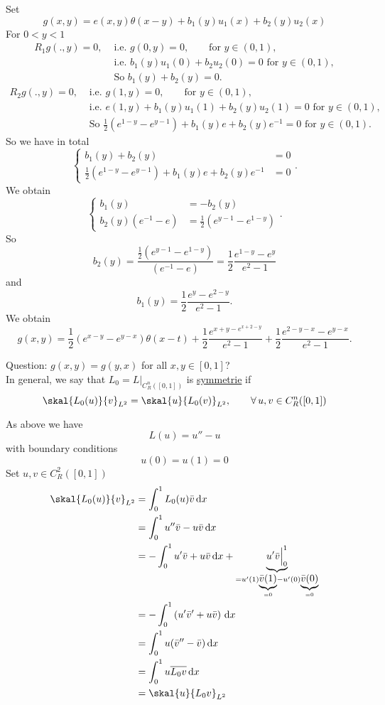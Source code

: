 Set 
\[
	g(x,y) = e(x,y)\theta(x-y) + b_1(y)u_1(x)+ b_2(y)u_2(x)
\]
For $0<y<1$
\begin{align*}
	R_1g(.,y)=0, &\text{ i.e. }g(0,y)=0, \qquad \text{for }y \in (0,1), \\
	 &\text{ i.e. }b_1(y)u_1(0)+ b_2u_2(0) = 0 \text{ for }y \in (0,1), \\
	 &\text{ So $b_1(y) + b_2(y) = 0$}.
\end{align*}
\begin{align*}
	R_2g(.,y)=0, &\text{ i.e. }g(1,y)=0, \qquad \text{for }y \in (0,1), \\
	 &\text{ i.e. }e(1,y) + b_1(y)u_1(1)+ b_2(y)u_2(1) = 0 \text{ for }y \in (0,1), \\
	 &\text{ So }\frac{1}{2}\left( e^{1-y}- e^{y-1} \right) + b_1(y)e + b_2(y)e^{-1}=0 \text{ for }y \in (0,1).
\end{align*}
So we have in total
\[
	\begin{cases}
		b_1(y) + b_2(y) &= 0 \\
		\frac{1}{2}\left( e^{1-y}- e^{y-1} \right) + b_1(y)e + b_2(y)e^{-1} &=0 
	\end{cases}.
\]
We obtain
\[
	\begin{cases}
		b_1(y) &= -b_2(y) \\
		b_2(y)\left(  e^{-1} - e \right) &= \frac{1}{2}\left( e^{y-1}- e^{1-y} \right)
	\end{cases}.
\]
So
\[
	b_2(y) = \frac{\frac{1}{2}(e^{y-1}-e^{1-y})}{\left( e^{-1}-e \right)} = \frac{1}{2} \frac{e^{1-y}-e^{y}}{e^2-1}
\]
and
\[
	b_1(y) = \frac{1}{2} \frac{e^y-e^{2-y}}{e^2 -1}.
\]
We obtain
\[
	g(x,y) = \frac{1}{2}(e^{x-y}- e^{y-x})\theta(x-t) + \frac{1}{2} \frac{e^{x+y-e^{x+2-y}}}{e^2-1} + \frac{1}{2} \frac{e^{2-y-x}-e^{y-x}}{e^2-1}.
\]

Question: $g(x,y)=g(y,x)$ for all $x,y \in [0,1]$? \\
In general, we say that $L_0 = L  \big|_{C^n_R([0,1])}^{}$ is \underline{symmetrie} if 
\[
	\skal{L_0(u)}{v}_{L^2} = \skal{u}{L_0(v)}_{L^2}, \qquad \forall\, u,v \in C_R^n([0,1])
\]

\begin{beispiel}[continue]
	As above we have
	\[
		L(u) = u'' - u
	\] with boundary conditions
	\[
		u(0)= u(1)=0
	\]
	Set $u,v \in C_R^2([0,1])$
	\begin{align*}
		\skal{L_0(u)}{v}_{L^2} &= \int_{0}^{1} L_0(u)\bar{v} \,\mathrm{d}x  \\ 
		&= \int_{0}^{1}u'' \bar{v}- u \bar{v} \,\mathrm{d}x \\  
		&= - \int_{0}^{1} u' \bar{v} + u \bar{v} \,\mathrm{d}x 
		+ \underset{=u'(1)\underset{=0}{\underbrace{\bar{v}(1)}}-u'(0) \underset{=0}{\underbrace{\bar{v}(0)}}}{\underbrace{u'\bar{v}  \Big|_{0}^{1}}} \\
		&= - \int_{0}^{1}\left( u' \bar{v}' + u \bar{v} \right) \,\mathrm{d}x \\
		&= \int_{0}^{1} u( \bar{v}'' - \bar{v}) \,\mathrm{d}x \\
		&= \int_{0}^{1} u \overline{L_0v} \,\mathrm{d}x \\
		&= \skal{u}{L_0v}_{L^2}
	\end{align*}
\end{beispiel}
\cleardoubleoddemptypage
{}
\setcounter{page}{1}

